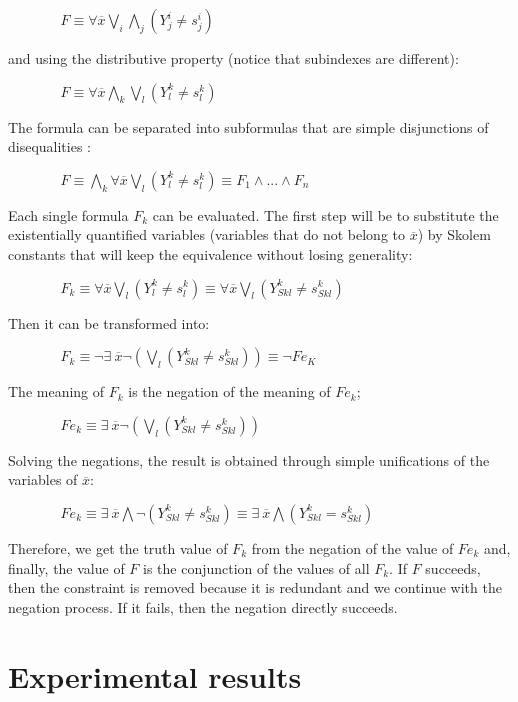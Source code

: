 \documentclass{tlp}
\begin{document}
$~~~~~~~~~~~~~~~~~ F \equiv \forall \overline{x} \bigvee_i\bigwedge_j (Y_j^i \neq s_j^i) $

\noindent
and using the distributive property (notice that subindexes are different):

$~~~~~~~~~~~~~~~~~ F \equiv \forall \overline{x} \bigwedge_k\bigvee_l (Y_l^k \neq s_l^k) $

The formula can be separated into subformulas that are simple
disjunctions of disequalities :

 $~~~~~~~~~~~~~~~~~ F \equiv \bigwedge_k \forall \overline{x} \bigvee_l (Y_l^k \neq s_l^k) \equiv F_1 \wedge ... \wedge F_n$

Each single formula $F_k$ can be evaluated. The first step will be to
substitute the existentially quantified variables (variables that do not
belong to $\overline{x}$) by Skolem constants that will keep
the equivalence without losing generality:

$~~~~~~~~~~~~~~~~~  F_k \equiv \forall \overline{x} \bigvee_l ( Y_l^k \neq s_l^k ) \equiv \forall \overline{x} \bigvee_l ( Y_{Sk l}^k \neq s_{Sk l}^k )  $

Then it can be transformed into:

$~~~~~~~~~~~~~~~~~ F_k \equiv  \neg \exists ~ \overline{x} \neg ( \bigvee_l (Y_{Sk l}^k \neq s_{Sk l}^k) ) \equiv \neg Fe_K $

The meaning of $F_k$ is the negation of the meaning of $Fe_k$;

$~~~~~~~~~~~~~~~~~ Fe_k \equiv \exists ~ \overline{x} \neg ( \bigvee_l (Y_{Sk l}^k \neq s_{Sk l}^k)) $
 
Solving the negations, the result is obtained through simple unifications of the variables of $\overline{x}$:

$~~~~~~~~~~~~~~~~~  Fe_k  \equiv \exists ~ \overline{x} \bigwedge \neg (Y_{Sk l}^k \neq s_{Sk l}^k)  \equiv \exists ~ \overline{x} \bigwedge (Y_{Sk l}^k = s_{Sk l}^k)  $

        Therefore, we get the truth value of $F_k$ from the
        negation of the value of $Fe_k$ and, finally, the value of $F$ is
        the conjunction of the values of all $F_k$. If $F$
        succeeds, then the constraint is removed because it is redundant
        and we continue with the negation process. If it fails, then
        the negation directly succeeds.


\section{Experimental results}
\label{results}
\end{document}

